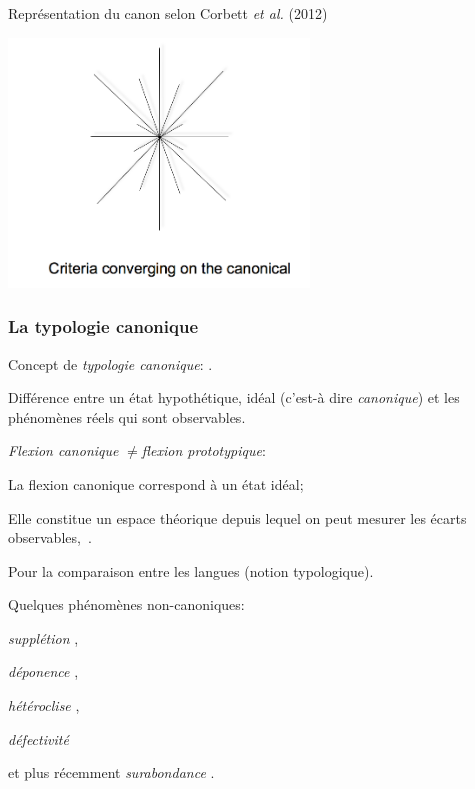 \begin{frame}[t]{Représentation du canon selon Corbett {\em et al.} (2012) \nocite{corbett12imm}}
\begin{center}
\includegraphics[width=80mm]{corbett-canon-star}
\label{fig:canonicity}
\end{center}
\end{frame}


\begin{frame}
\frametitle{La typologie canonique}
\begin{wideitemize}
\item Concept de {\em typologie canonique}: \cite{corbett03}.
\item Différence entre un état hypothétique, idéal (c'est-à dire {\em
    canonique}) et les phénomènes réels qui sont observables.
\item {\em Flexion
  canonique} $\neq${\em  flexion prototypique}:
\begin{smallwideitemize}
\item La flexion canonique correspond à un état idéal;
\item Elle constitue un espace théorique depuis lequel on peut mesurer
  les écarts observables,~\cite{corbett07b}.
\item Pour la comparaison entre les langues (notion typologique).
\end{smallwideitemize}
\item Quelques phénomènes non-canoniques:
\begin{smallwideitemize}
\item {\em supplétion} \cite{boye06,bonami06},
\item {\em déponence} \cite{baerman07bookdepo}, 
\item {\em hétéroclise} \cite{stump06a},
\item {\em
  défectivité} \cite{baerman10defectbook}
\item et plus récemment {\em
  surabondance} \cite{thornton10}.
\end{smallwideitemize}
\end{wideitemize}
\end{frame}

